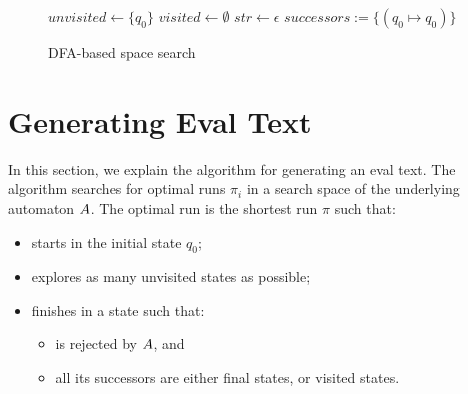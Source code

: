 \documentclass[acmsmall,screen]{acmart}
\begin{document}
 \begin{figure}[t]
\begin{center}
\begin{algorithm}[H]
\caption{DFA-based space search}
\label{algo:basic}
    $unvisited \leftarrow \{q_0\}$\;
    $visited \leftarrow \emptyset$\;
    $str \leftarrow \epsilon$\;
    $successors:=\{ (q_0\mapsto q_0)\}$\;
    
      \label{ln:ret}
\end{algorithm}		
\end{center}
\vspace*{-7mm}
\end{figure}


\section{Generating Eval Text}\label{sec:genText}
In this section, we explain the algorithm for generating an eval text. The algorithm searches for optimal runs $\pi_i$ in a search space of the underlying automaton $A$. The optimal run is the shortest run $\pi$ such that:

\begin{itemize}
 \item starts in the initial state $q_0$;
\item explores as many unvisited states as possible;
\item finishes in a state such that:
   \begin{itemize}
     \item is rejected by $A$, and
	\item all its successors are either final states, or visited states.
      \end{itemize}
 \end{itemize}
\end{document}
